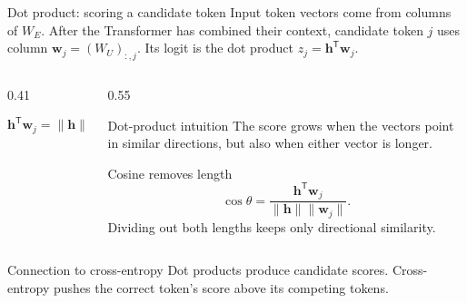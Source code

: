 \begin{frame}{Dot product: scoring a candidate token}
  \small
  Input token vectors come from columns of \(W_E\). After the Transformer has
  combined their context, candidate token \(j\) uses column
  \(\mathbf w_j={(W_U)}_{:,j}\). Its logit is the dot product
  \(z_j=\mathbf{h}^{\mathsf T}\mathbf{w}_j\).

  \begin{columns}[T]
    \begin{column}{0.41\textwidth}
      \centering

      \[
        \mathbf{h}^{\mathsf T}\mathbf{w}_j
        =\lVert\mathbf{h}\rVert
         \lVert\mathbf{w}_j\rVert\cos\theta
      \]
    \end{column}
    \begin{column}{0.55\textwidth}
      \footnotesize
      \begin{block}{Dot-product intuition}
        The score grows when the vectors point in similar directions, but also
        when either vector is longer.
      \end{block}

      \begin{block}{Cosine removes length}
        \[
          \cos\theta=
          \frac{\mathbf{h}^{\mathsf T}\mathbf{w}_j}
          {\lVert\mathbf{h}\rVert\lVert\mathbf{w}_j\rVert}.
        \]
        Dividing out both lengths keeps only directional similarity.
      \end{block}
    \end{column}
  \end{columns}

  \vspace{-0.2em}
  \begin{alertblock}{Connection to cross-entropy}
    \footnotesize
    Dot products produce candidate scores. Cross-entropy pushes the correct
    token's score above its competing tokens.
  \end{alertblock}
\end{frame}

